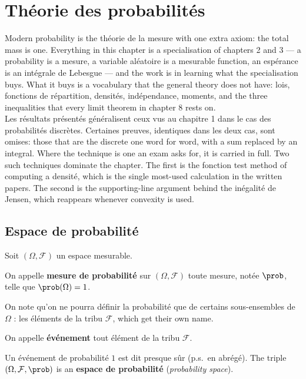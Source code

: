 \section{Théorie des probabilités}

Modern probability is the théorie de la mesure with one extra axiom: the total mass
is one. Everything in this chapter is a specialisation of chapters 2 and 3 --- a
probability is a mesure, a variable aléatoire is a mesurable function, an espérance
is an intégrale de Lebesgue --- and the work is in learning what the specialisation
buys. What it buys is a vocabulary that the general theory does not have: lois,
fonctions de répartition, densités, indépendance, moments, and the three
inequalities that every limit theorem in chapter 8 rests on.\\

Les résultats présentés généralisent ceux vus au chapitre 1 dans le cas des
probabilités discrètes. Certaines preuves, identiques dans les deux cas, sont
omises: those that are the discrete one word for word, with a sum replaced by an
integral. Where the technique is one an exam asks for, it is carried in full. Two
such techniques dominate the chapter. The first is the fonction test method of computing a densité, which is the single
most-used calculation in the written papers. The second is the supporting-line
argument behind the inégalité de Jensen,
which reappears whenever convexity is used.

\subsection{Espace de probabilité}

Soit $(\Omega,\mathcal{F})$ un espace mesurable.

\begin{definition}
  On appelle \textbf{mesure de probabilité} sur $(\Omega,\mathcal{F})$ toute
  mesure, notée $\prob$, telle que $\prob(\Omega)=1$.
\end{definition}

On note qu'on ne pourra définir la probabilité que de certains sous-ensembles de
$\Omega$ : les éléments de la tribu $\mathcal{F}$, which get their own name.

\begin{definition}[Événement]
  On appelle \textbf{événement} tout élément de la tribu $\mathcal{F}$.
\end{definition}

Un événement de probabilité $1$ est dit presque sûr (p.s.\ en abrégé). The
triple $(\Omega,\mathcal{F},\prob)$ is an \textbf{espace de probabilité}
(\textit{probability space}).

